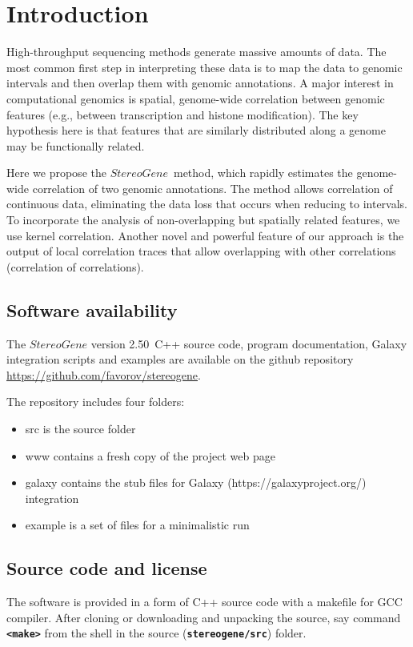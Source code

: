 \documentclass{article}
\title {\sgv}
\author{User manual}
\newcommand{\prm}[1]{\texttt{\textbf{{#1}}}}
\newcommand{\sg}{$StereoGene$\ }
\newcommand{\sgv}{$StereoGene$ version 2.50\ }
\begin{document}
\maketitle 

\tableofcontents

\section{Introduction}

High-throughput sequencing methods generate massive amounts of data.  The most common first step in interpreting these data is to map the data to genomic intervals and then overlap them with genomic annotations. A major interest in computational genomics is spatial, genome-wide correlation between genomic features (e.g., between transcription and histone modification). The key hypothesis here is that features that are similarly distributed along a genome may be functionally related.

Here we propose the \sg method, which rapidly estimates the genome-wide correlation of two genomic annotations. The method allows correlation of continuous data, eliminating the data loss that occurs when reducing to intervals. To incorporate the analysis of non-overlapping but spatially related features, we use kernel correlation.  Another novel and powerful feature of our approach is the output of local correlation traces that allow overlapping with other correlations (correlation of correlations). 
\subsection{Software availability}
The \sgv C++ source code, program documentation, Galaxy integration scripts and examples are available on the  github repository \url{https://github.com/favorov/stereogene}.

The repository includes four folders: 
\begin{itemize}
\item src is the source folder
\item www contains a fresh copy of the project web page
\item galaxy contains the stub files for Galaxy (https://galaxyproject.org/) integration
\item example is a set of files for a minimalistic run 
\end{itemize}

\subsection{Source code and license}
The software is provided in a form of C++ source code with a makefile for GCC compiler. After cloning or downloading and unpacking the source, say command \prm{<make>} from the shell in the source (\prm{stereogene/src}) folder. 
\end{document}
